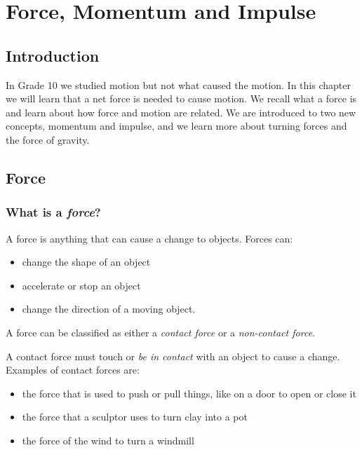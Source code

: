 \chapter{Force, Momentum and Impulse}
\label{p:m:fmi11}



\section{Introduction}
In Grade 10 we studied motion but not what caused the motion. In this chapter we will learn that a net force is needed to cause motion. We recall what a force is and learn about how force and motion are related. We are introduced to two new concepts, momentum and impulse, and we learn more about turning forces and the force of gravity.\\
\section{Force}

\subsection{What is a \textit{force}?}
A force is anything that can cause a change to objects. Forces can:
\begin{itemize}
\item change the shape of an object
\item accelerate or stop an object
\item change the direction of a moving object.
\end{itemize}

A force can be classified as either a \textit{contact force} or a \textit{non-contact force}.

A contact force must touch or \textit{be in contact} with an object to cause a change. Examples of contact forces are:
\begin{itemize}
\item the force that is used to push or pull things, like on a door to open or close it
\item the force that a sculptor uses to turn clay into a pot
\item the force of the wind to turn a windmill
\end{itemize}


